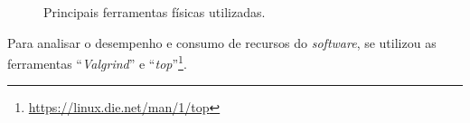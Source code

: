 \begin{figure}[!ht]
    \begin{center}
        \qquad
        \caption{Principais ferramentas físicas utilizadas.}
        \label{fig:tools}
    \end{center}
\end{figure}

Para analisar o desempenho e consumo de recursos do \textit{software}, se utilizou as ferramentas ``\textit{Valgrind}'' e ``\textit{top}''\footnote{\href{https://linux.die.net/man/1/top}{https://linux.die.net/man/1/top}}.
